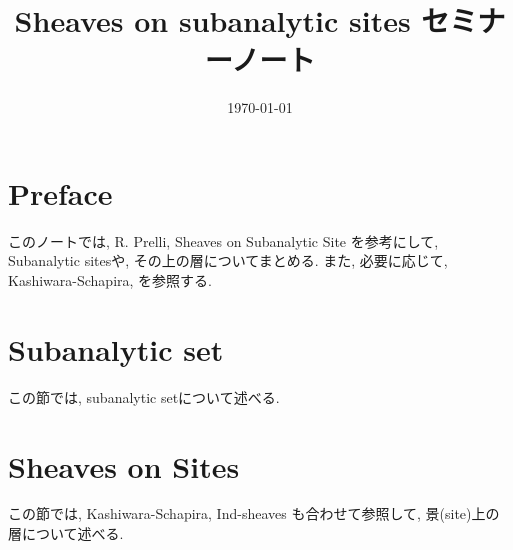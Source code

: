 \documentclass[nomag*,a4paper,leqno]{jsarticle}
\title{\vspace{-2.5em}Sheaves on subanalytic sites セミナーノート\vspace{-1em}}
\date{\vspace{-1em}\today\vspace{-1.5em}}
\numberwithin{thm}{subsection}
\numberwithin{equation}{subsection}
\begin{document}
\maketitle
\tableofcontents
\addtocounter{section}{-1}
\section{Preface}
このノートでは,
R. Prelli,
Sheaves on Subanalytic Site \cite{book:Prelli}
を参考にして,
Subanalytic sitesや,
その上の層についてまとめる.
また, 必要に応じて,
Kashiwara-Schapira\cite{book:KS_sh}, \cite{book:KS_cat}
を参照する.

\section{Subanalytic set}
この節では, subanalytic setについて述べる.


\section{Sheaves on Sites}
この節では,
Kashiwara-Schapira, Ind-sheaves \cite{book:KS_ind}
も合わせて参照して,
景(site)上の層について述べる.



\end{document}
